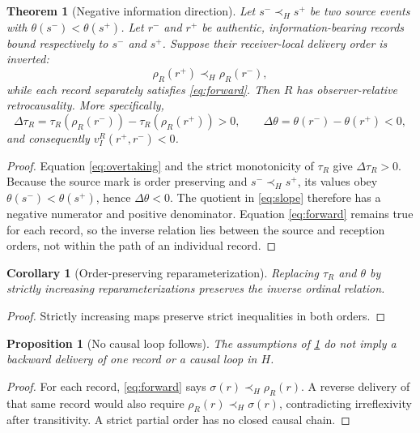 \documentclass[11pt]{article}
\newtheorem{theorem}{Theorem}[section]
\newtheorem{proposition}{Proposition}[section]
\newtheorem{corollary}{Corollary}[section]
\theoremstyle{remark}
\newcommand{\host}{\prec_{\!H}}
\begin{document}
\begin{theorem}[Negative information direction]
\label{thm:existence}
Let $s^-\host s^+$ be two source events with
$\theta(s^-)<\theta(s^+)$.  Let $r^-$ and $r^+$ be authentic,
information-bearing records bound respectively to $s^-$ and $s^+$.  Suppose
their receiver-local delivery order is inverted:
\begin{equation}
  \rho_R(r^+)\host\rho_R(r^-),
  \label{eq:overtaking}
\end{equation}
while each record separately satisfies \cref{eq:forward}.  Then $R$ has
observer-relative retrocausality.  More specifically,
\[
  \Delta\tau_R=
  \tau_R(\rho_R(r^-)) - \tau_R(\rho_R(r^+))>0,
  \qquad
  \Delta\theta=\theta(r^-)-\theta(r^+)<0,
\]
and consequently $v_I^R(r^+,r^-)<0$.
\end{theorem}

\begin{proof}
Equation \cref{eq:overtaking} and the strict monotonicity of $\tau_R$ give
$\Delta\tau_R>0$.  Because the source mark is order preserving and
$s^-\host s^+$, its values obey $\theta(s^-)<\theta(s^+)$, hence
$\Delta\theta<0$.  The quotient in \cref{eq:slope} therefore has a negative
numerator and positive denominator.  Equation \cref{eq:forward} remains true
for each record, so the inverse relation lies between the source and
reception orders, not within the path of an individual record.
\end{proof}

\begin{corollary}[Order-preserving reparameterization]
\label{cor:reparameterization}
Replacing $\tau_R$ and $\theta$ by strictly increasing reparameterizations
preserves the inverse ordinal relation.
\end{corollary}

\begin{proof}
Strictly increasing maps preserve strict inequalities in both orders.
\end{proof}

\begin{proposition}[No causal loop follows]
\label{prop:no-loop}
The assumptions of \cref{thm:existence} do not imply a backward delivery of
one record or a causal loop in $H$.
\end{proposition}

\begin{proof}
For each record, \cref{eq:forward} says
$\sigma(r)\host\rho_R(r)$.  A reverse delivery of that same record would
also require $\rho_R(r)\host\sigma(r)$, contradicting irreflexivity after
transitivity.  A strict partial order has no closed causal chain.
\end{proof}
\end{document}
